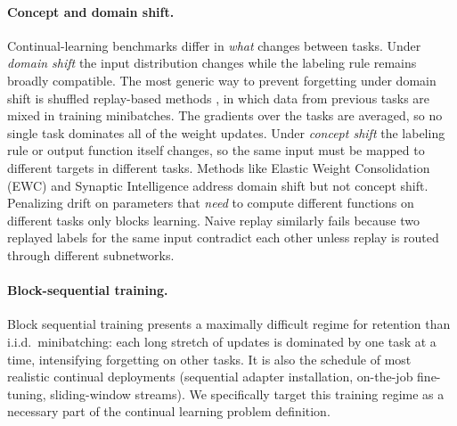 \documentclass{article}
\begin{document}
\paragraph{Concept and domain shift.}
Continual-learning benchmarks differ in \emph{what} changes between tasks. Under \emph{domain shift} the input distribution changes while the labeling rule remains broadly compatible. The most generic way to prevent forgetting under domain shift is shuffled replay-based methods \citep{lopez2017gradient,chaudhry2018efficient,buzzega2020dark}, in which data from previous tasks are mixed in training minibatches. The gradients over the tasks are averaged, so no single task dominates all of the weight updates. Under \emph{concept shift} the labeling rule or output function itself changes, so the same input must be mapped to different targets in different tasks. Methods like Elastic Weight Consolidation (EWC) and Synaptic Intelligence \citep{kirkpatrick2017overcoming,zenke2017continual} address domain shift but not concept shift. Penalizing drift on parameters that \emph{need} to compute different functions on different tasks only blocks learning. Naive replay similarly fails because two replayed labels for the same input contradict each other unless replay is routed through different subnetworks. 

\paragraph{Block-sequential training.}
Block sequential training presents a maximally difficult regime for retention than i.i.d.\ minibatching: each long stretch of updates is dominated by one task at a time, intensifying forgetting on other tasks. It is also the schedule of most realistic continual deployments (sequential adapter installation, on-the-job fine-tuning, sliding-window streams). We specifically target this training regime as a necessary part of the continual learning problem definition.
\end{document}

